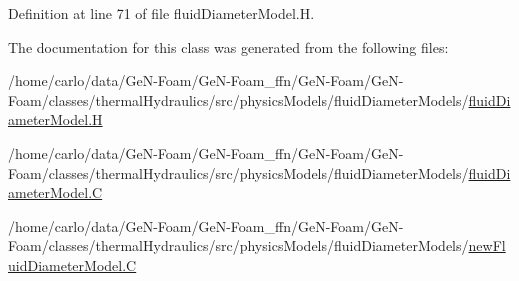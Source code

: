 Definition at line 71 of file fluid\+Diameter\+Model.\+H.



The documentation for this class was generated from the following files\+:\begin{DoxyCompactItemize}
\item 
/home/carlo/data/\+Ge\+N-\/\+Foam/\+Ge\+N-\/\+Foam\+\_\+ffn/\+Ge\+N-\/\+Foam/\+Ge\+N-\/\+Foam/classes/thermal\+Hydraulics/src/physics\+Models/fluid\+Diameter\+Models/\hyperlink{fluidDiameterModel_8H}{fluid\+Diameter\+Model.\+H}\item 
/home/carlo/data/\+Ge\+N-\/\+Foam/\+Ge\+N-\/\+Foam\+\_\+ffn/\+Ge\+N-\/\+Foam/\+Ge\+N-\/\+Foam/classes/thermal\+Hydraulics/src/physics\+Models/fluid\+Diameter\+Models/\hyperlink{fluidDiameterModel_8C}{fluid\+Diameter\+Model.\+C}\item 
/home/carlo/data/\+Ge\+N-\/\+Foam/\+Ge\+N-\/\+Foam\+\_\+ffn/\+Ge\+N-\/\+Foam/\+Ge\+N-\/\+Foam/classes/thermal\+Hydraulics/src/physics\+Models/fluid\+Diameter\+Models/\hyperlink{newFluidDiameterModel_8C}{new\+Fluid\+Diameter\+Model.\+C}\end{DoxyCompactItemize}
